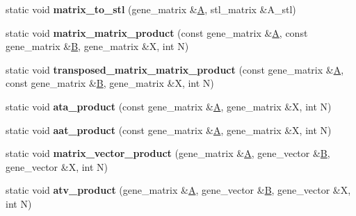 \begin{DoxyCompactItemize}
\item 
\mbox{\label{classblaze__interface_ab503e3ef1d52c07b2d414e2a0a5425d1}} 
static void {\bfseries matrix\+\_\+to\+\_\+stl} (gene\+\_\+matrix \&\hyperlink{group___core___module_class_eigen_1_1_matrix}{A}, stl\+\_\+matrix \&A\+\_\+stl)
\item 
\mbox{\label{classblaze__interface_af77336b5b54dcafef116c3b05e12c18b}} 
static void {\bfseries matrix\+\_\+matrix\+\_\+product} (const gene\+\_\+matrix \&\hyperlink{group___core___module_class_eigen_1_1_matrix}{A}, const gene\+\_\+matrix \&\hyperlink{group___core___module_class_eigen_1_1_matrix}{B}, gene\+\_\+matrix \&X, int N)
\item 
\mbox{\label{classblaze__interface_a069c8f5a97adf1cf38df109cfc52adcd}} 
static void {\bfseries transposed\+\_\+matrix\+\_\+matrix\+\_\+product} (const gene\+\_\+matrix \&\hyperlink{group___core___module_class_eigen_1_1_matrix}{A}, const gene\+\_\+matrix \&\hyperlink{group___core___module_class_eigen_1_1_matrix}{B}, gene\+\_\+matrix \&X, int N)
\item 
\mbox{\label{classblaze__interface_a138a096e3117f9e0f019583e061c0ade}} 
static void {\bfseries ata\+\_\+product} (const gene\+\_\+matrix \&\hyperlink{group___core___module_class_eigen_1_1_matrix}{A}, gene\+\_\+matrix \&X, int N)
\item 
\mbox{\label{classblaze__interface_a462cadf053dad7bc327dfd4568b95cd9}} 
static void {\bfseries aat\+\_\+product} (const gene\+\_\+matrix \&\hyperlink{group___core___module_class_eigen_1_1_matrix}{A}, gene\+\_\+matrix \&X, int N)
\item 
\mbox{\label{classblaze__interface_a8c291c5e17cc5f67604a1f913ce185d4}} 
static void {\bfseries matrix\+\_\+vector\+\_\+product} (gene\+\_\+matrix \&\hyperlink{group___core___module_class_eigen_1_1_matrix}{A}, gene\+\_\+vector \&\hyperlink{group___core___module_class_eigen_1_1_matrix}{B}, gene\+\_\+vector \&X, int N)
\item 
\mbox{\label{classblaze__interface_a376d27a47f9518236ed739cabaa802e8}} 
static void {\bfseries atv\+\_\+product} (gene\+\_\+matrix \&\hyperlink{group___core___module_class_eigen_1_1_matrix}{A}, gene\+\_\+vector \&\hyperlink{group___core___module_class_eigen_1_1_matrix}{B}, gene\+\_\+vector \&X, int N)

\end{DoxyCompactItemize}
